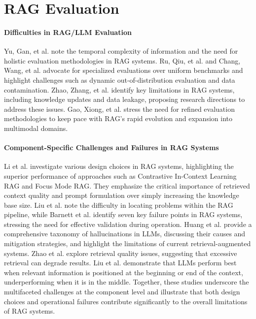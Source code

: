 \section{RAG Evaluation}

\paragraph{Difficulties in RAG/LLM Evaluation}
Yu, Gan, et al. \cite{Yu.2024} note the temporal complexity of information and the need for holistic evaluation methodologies in RAG systems. Ru, Qiu, et al. \cite{Ru.15.08.2024} and Chang, Wang, et al. \cite{Chang.06.07.2023} advocate for specialized evaluations over uniform benchmarks and highlight challenges such as dynamic out-of-distribution evaluation and data contamination. Zhao, Zhang, et al. \cite{Zhao.29.02.2024} identify key limitations in RAG systems, including knowledge updates and data leakage, proposing research directions to address these issues. Gao, Xiong, et al. \cite{Gao.18.12.2023} stress the need for refined evaluation methodologies to keep pace with RAG's rapid evolution and expansion into multimodal domains. 

\paragraph{Component-Specific Challenges and Failures in RAG Systems}
Li et al.\cite{Li.13.01.2025} investigate various design choices in RAG systems, highlighting the superior performance of approaches such as Contrastive In-Context Learning RAG and Focus Mode RAG. They emphasize the critical importance of retrieved context quality and prompt formulation over simply increasing the knowledge base size. Liu et al.\cite{JintaoLiu.2024} note the difficulty in locating problems within the RAG pipeline, while Barnett et al.\cite{Barnett.2024} identify seven key failure points in RAG systems, stressing the need for effective validation during operation. Huang et al.\cite{Huang_2023} provide a comprehensive taxonomy of hallucinations in LLMs, discussing their causes and mitigation strategies, and highlight the limitations of current retrieval-augmented systems. Zhao et al.\cite{Zhao.29.02.2024} explore retrieval quality issues, suggesting that excessive retrieval can degrade results. Liu et al.\cite{Liu.06.07.2023} demonstrate that LLMs perform best when relevant information is positioned at the beginning or end of the context, underperforming when it is in the middle. Together, these studies underscore the multifaceted challenges at the component level and illustrate that both design choices and operational failures contribute significantly to the overall limitations of RAG systems.


